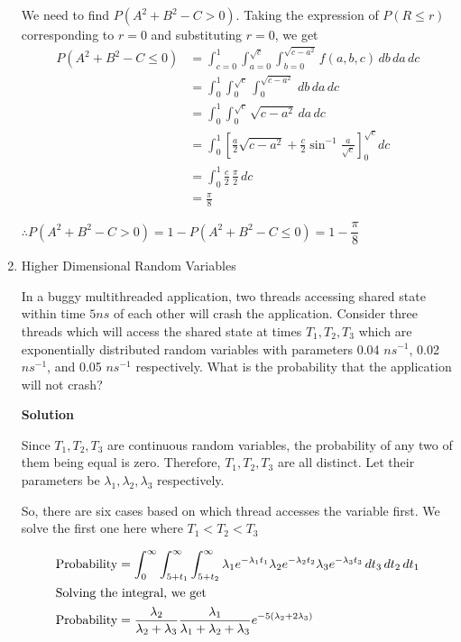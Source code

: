 \documentclass[12pt, oneside]{article}
\begin{document}
\begin{enumerate}
{    We need to find \(P(A^2 + B^2 - C > 0)\). Taking the expression of \(P(R \leq r)\)
    corresponding to \(r = 0\) and substituting \(r = 0\), we get
    \begin{align*}
        P(A^2 + B^2 - C \leq 0) &= \int_{c = 0}^{1} \int_{a=0}^{\sqrt{c}} 
                                    \int_{b = 0}^{\sqrt{c - a^2}} f(a, b, c)\, db\, da\, dc \\
                                &= \int_{0}^{1} \int_{0}^{\sqrt{c}} 
                                \int_{0}^{\sqrt{c - a^2}} \, db\, da\, dc \\
                                &= \int_{0}^{1} \int_{0}^{\sqrt{c}} \sqrt{c - a^2}\, da\, dc \\
                                &= \int_{0}^{1} \left[\frac{a}{2}\sqrt{c - a^2} + \frac{c}{2}
                                    \sin^{-1}{\frac{a}{\sqrt{c}}}\right]^{\sqrt{c}}_{0} dc \\
                                &= \int_{0}^{1} \frac{c}{2} \, \frac{\pi}{2} \, dc \\
                                &= \frac{\pi}{8}
    \end{align*}

    \(\therefore P(A^2 + B^2 - C > 0) = 1 - P(A^2 + B^2 - C \leq 0) = 1 - \dfrac{\pi}{8}\)
}

\item {
    Higher Dimensional Random Variables

    In a buggy multithreaded application, two threads accessing shared state within time
    \(5 ns\) of each other will crash the application. Consider three threads which will 
    access the shared state at times \(T_1, T_2, T_3\) which are exponentially
    distributed random variables with parameters 0.04 \(ns^{-1}\), 0.02 \(ns^{-1}\),
    and 0.05 \(ns^{-1}\) respectively. What is the probability that the application will
    not crash?

    \textbf{Solution}

    Since \(T_1, T_2, T_3\) are continuous random variables, the probability of any two
    of them being equal is zero. Therefore, \(T_1, T_2, T_3\) are all distinct. Let their
    parameters be \(\lambda_1, \lambda_2, \lambda_3\) respectively.

    So, there are six cases based on which thread accesses the variable first. We solve
    the first one here where \(T_1 < T_2 < T_3\)

    \begin{align*}
        \text{Probability} &= \int_{0}^{\infty} \int_{5 + t_1}^{\infty} \int_{5 + t_2}^{\infty}
                \lambda_1 e^{-\lambda_1 t_1} \lambda_2 e^{-\lambda_2 t_2} \lambda_3 e^{-\lambda_3 t_3}
                \,dt_3 \,dt_2 \,dt_1 \\
        \intertext{Solving the integral, we get}
        \text{Probability} &= \frac{\lambda_2}{\lambda_2 + \lambda_3} 
                \frac{\lambda_1}{\lambda_1 + \lambda_2 + \lambda_3} e^{-5(\lambda_2 + 2\lambda_3)}
    \end{align*}

}
\end{enumerate}
\end{document}
